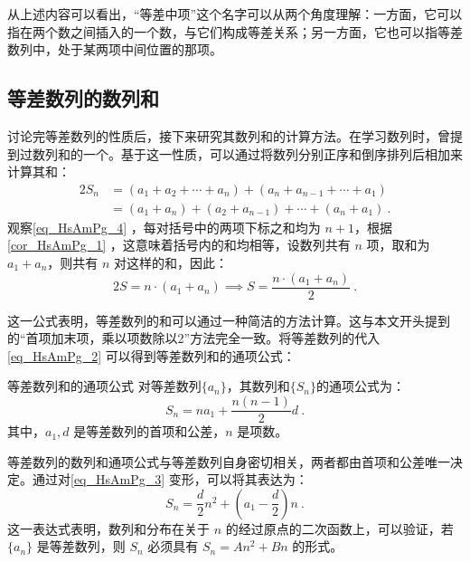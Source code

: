 从上述内容可以看出，“等差中项”这个名字可以从两个角度理解：一方面，它可以指在两个数之间插入的一个数，与它们构成等差关系；另一方面，它也可以指等差数列中，处于某两项中间位置的那项。

\subsection{等差数列的数列和}

讨论完等差数列的性质后，接下来研究其数列和的计算方法。在学习数列时，曾提到过数列和的一个。基于这一性质，可以通过将数列分别正序和倒序排列后相加来计算其和：
\begin{equation}\label{eq_HsAmPg_4}
\begin{split}
2S_n &= (a_1 + a_2 + \cdots + a_n)+(a_n + a_{n-1} + \cdots + a_1)\\
&=(a_1+a_{n})+(a_2+a_{n-1}) +\cdots +(a_n+a_1)~.
\end{split}
\end{equation}
观察\autoref{eq_HsAmPg_4} ，每对括号中的两项下标之和均为 $n+1$，根据\autoref{cor_HsAmPg_1} ，这意味着括号内的和均相等，设数列共有 $n$ 项，取和为$a_1 + a_n$，则共有 $n$ 对这样的和，因此：
\begin{equation}\label{eq_HsAmPg_2}
2S = n \cdot (a_1+a_n)\implies S = \frac{n\cdot(a_1+a_n)}{2}~.
\end{equation}

这一公式表明，等差数列的和可以通过一种简洁的方法计算。这与本文开头提到的“首项加末项，乘以项数除以2”方法完全一致。将等差数列的代入\autoref{eq_HsAmPg_2} 可以得到等差数列和的通项公式：
\begin{corollary}{等差数列和的通项公式}
对等差数列$\{a_n\}$，其数列和$\{S_n\}$的通项公式为：
\begin{equation}\label{eq_HsAmPg_3}
S_n = na_1+\frac{n(n-1)}{2}d~.
\end{equation}
其中，$a_1,d$ 是等差数列的首项和公差，$n$ 是项数。
\end{corollary}

等差数列的数列和通项公式与等差数列自身密切相关，两者都由首项和公差唯一决定。通过对\autoref{eq_HsAmPg_3} 变形，可以将其表达为：
\begin{equation}
S_n = \frac{d}{2}n^2+\left(a_1-\frac{d}{2}\right)n~.
\end{equation}
这一表达式表明，数列和分布在关于 $n$ 的经过原点的二次函数上，可以验证，若 $\{a_n\}$ 是等差数列，则 $S_n$ 必须具有 $S_n = An^2 + Bn$ 的形式。

